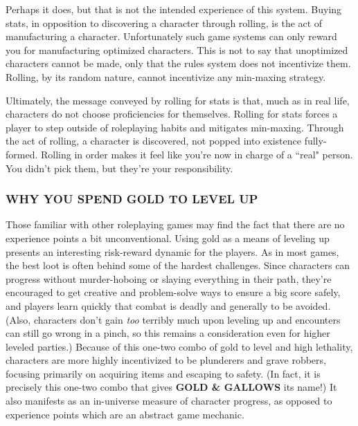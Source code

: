 \documentclass[twoside]{article}
\begin{document}
\begin{enumerate}[nosep]
Perhaps it does, but that is not the intended experience of this system. Buying stats, in opposition to discovering a character through rolling, is the act of manufacturing a character. Unfortunately such game systems can only reward you for manufacturing optimized characters. This is not to say that unoptimized characters cannot be made, only that the rules system does not incentivize them. Rolling, by its random nature, cannot incentivize any min-maxing strategy.
\end{enumerate}

\bigbreak

Ultimately, the message conveyed by rolling for stats is that, much as in real life, characters do not choose proficiencies for themselves. Rolling for stats forces a player to step outside of roleplaying habits and mitigates min-maxing. Through the act of rolling, a character is discovered, not popped into existence fully-formed. Rolling in order makes it feel like you're now in charge of a ``real" person. You didn't pick them, but they're your responsibility.

\subsubsection*{\footnotesize{W}\scriptsize{HY YOU SPEND GOLD TO LEVEL UP}\normalsize}

Those familiar with other roleplaying games may find the fact that there are no experience points a bit unconventional. Using gold as a means of leveling up presents an interesting risk-reward dynamic for the players. As in most games, the best loot is often behind some of the hardest challenges. Since characters can progress without murder-hoboing or slaying everything in their path, they're encouraged to get creative and problem-solve ways to ensure a big score safely, and players learn quickly that combat is deadly and  generally to be avoided. (Also, characters don't gain \emph{too} terribly much upon leveling up and encounters can still go wrong in a pinch, so this remains a consideration even for higher leveled parties.) Because of this one-two combo of gold to level and high lethality, characters are more highly incentivized to be plunderers and grave robbers, focusing primarily on acquiring items and escaping to safety. (In fact, it is precisely this one-two combo that gives \textbf{GOLD \& GALLOWS} its name!) It also manifests as an in-universe measure of character progress, as opposed to experience points which are an abstract game mechanic.
\end{document}
